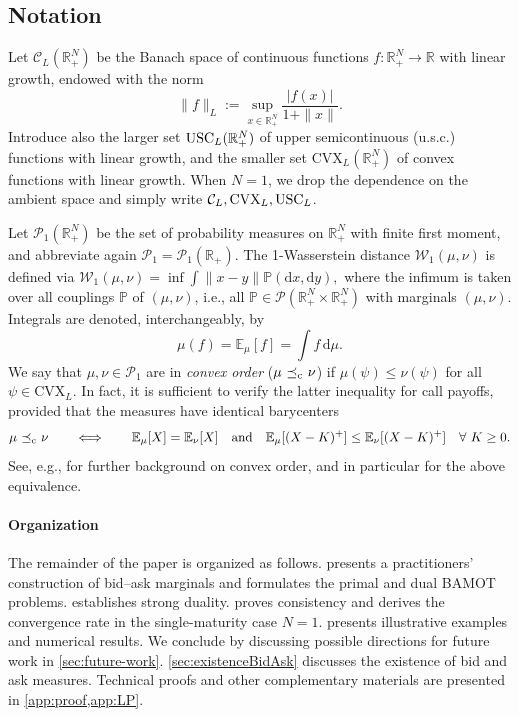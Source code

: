 \documentclass[11pt]{article}
\newcommand{\cC}{\mathcal{C}}
\newcommand{\cP}{\mathcal{P}}
\newcommand{\cW}{\mathcal{W}}
\newcommand{\PP}{\mathbb{P}}
\newcommand{\R}{\mathbb{R}} %
\theoremstyle{plain}
\theoremstyle{definition}
\theoremstyle{remark}
\newcommand{\E}{\mathbb{E}}
\newcommand*{\rd}{\mathrm{d}}
\newcommand*{\dd}{\, \rd}
\DeclareMathOperator{\cleq}{\,\preceq_{\rm c}\,}
\theoremstyle{plain}
\begin{document}
%
%
%
%
%
%
%
%




%
%

%
%
%
%
%
%
%
%
%
%
%
%
%
%

%




%

%


\subsection{Notation}

Let $\cC_L(\R^N_+)$ be the Banach space  of 
 continuous  functions $f: \R^N_+\to\R$ with linear growth, endowed with the norm 
 $$\lVert f \rVert_L := \sup_{x\in \R_+^N}\frac{|f(x)|}{1 + \|x\|}.$$ 
 Introduce also the larger set $\textnormal{USC}_L(\R_+^N)$ of upper semicontinuous (u.s.c.) functions  with linear growth, and the smaller set $\text{CVX}_L(\R_+^N)$ of convex functions with linear growth. When $N= 1$, we drop the dependence on the ambient space and simply write $\cC_L, \text{CVX}_L, \textnormal{USC}_L$.

Let $\cP_1(\R^N_+)$ be the set of probability measures on $\R^N_+$ with finite first moment, and abbreviate again $\cP_1 = \cP_1(\R_+)$. The 1-Wasserstein distance $\cW_1(\mu,\nu)$ is defined via 
$
 \cW_1(\mu,\nu) = \inf \int \|x-y\| \PP(\rd x,\rd y),
$
where the infimum is taken over all couplings $\PP$ of $(\mu, \nu)$, i.e., all $\PP \in \cP(\R_+^N\times \R_+^N)$ with marginals $(\mu,\nu)$. Integrals are denoted, interchangeably, by  
 $$\mu(f) = \E_{\mu}[f]= \int f \dd\mu. $$%
We say that $\mu,\nu \in \cP_1$ are in \textit{convex order} ($\mu\cleq \nu$) if
$\mu(\psi) \le \nu(\psi)$ for all $\psi\in \text{CVX}_L$. In fact, it is sufficient to verify the latter inequality for call payoffs, provided that the measures have identical barycenters    \begin{equation}\label{eq:callCVX}
    \mu \cleq \nu \qquad  \Longleftrightarrow \qquad \E_\mu[X] = \E_\nu[X] \quad\text{and}\quad \E_\mu[(X-K)^+]   \leq  \E_\nu[(X-K)^+] \quad \forall \ K\ge 0.
    \end{equation}
See, e.g., \cite{Shaked2007} for further background on  convex order, and in particular \cite[Theorem~3.A.1]{Shaked2007} for the above equivalence.



\paragraph{Organization}
The remainder of the paper is organized as follows.  presents a practitioners' construction of bid--ask marginals and formulates the primal and dual BAMOT problems.  establishes strong duality.  proves consistency and derives the convergence rate in the single-maturity case $N=1$.  presents illustrative examples and numerical results. We conclude by discussing possible directions for future work in \cref{sec:future-work}.  
\cref{sec:existenceBidAsk} discusses the existence of bid and ask measures. %
%
Technical proofs and other complementary materials are presented in  \cref{app:proof,app:LP}.
\end{document}

